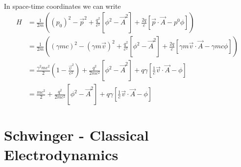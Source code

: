 \documentclass[10pt,a4paper]{book}
\theoremstyle{definition}
\begin{document}
\begin{enumerate}
\begin{align}
\end{align}
In space-time coordinates we can write
\begin{align}
H&=\frac{1}{2m}\left((p_0)^2-\vec{p}^2+\frac{q^2}{c^2}[\phi^2-\vec{A}^2]+\frac{2q}{c}[\vec{p}\cdot\vec{A}-p^0\phi]\right)\\
&=\frac{1}{2m}\left((\gamma m c)^2-(\gamma m\vec{v})^2+\frac{q^2}{c^2}[\phi^2-\vec{A}^2]+\frac{2q}{c}[\gamma m\vec{v}\cdot\vec{A}-\gamma m c\phi]\right)\\
&=\frac{\gamma^2mc^2}{2}\left(1-\frac{\vec{v}^2}{c^2}\right)+\frac{q^2}{2mc^2}[\phi^2-\vec{A}^2]+q\gamma[\frac{1}{c}\vec{v}\cdot\vec{A}- \phi]\\
&=\frac{mc^2}{2}+\frac{q^2}{2mc^2}[\phi^2-\vec{A}^2]+q\gamma[\frac{1}{c}\vec{v}\cdot\vec{A}- \phi]
\end{align}
\end{enumerate}

\section{{\sc Schwinger} - Classical Electrodynamics}
\end{document}
